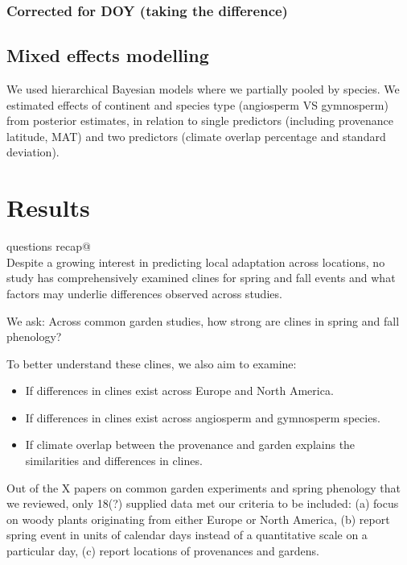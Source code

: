 \documentclass{article}
\begin{document}
\subsubsection{Corrected for DOY (taking the difference)}
\subsection{Mixed effects modelling}

We used hierarchical Bayesian models where we partially pooled by species. We estimated effects of continent and species type (angiosperm VS gymnosperm) from posterior estimates, in relation to single predictors (including provenance latitude, MAT) and two predictors (climate overlap percentage and standard deviation). 


\section{Results}

\verb@Research questions recap@
\\
Despite a growing interest in predicting local adaptation across locations, no study has comprehensively examined clines for spring and fall events and what factors may underlie differences observed across studies.

We ask: Across common garden studies, how strong are clines in spring and fall phenology?

To better understand these clines, we also aim to examine:
\begin{itemize}
\item If differences in clines exist across Europe and North America.
\item If differences in clines exist across angiosperm and gymnosperm species.
\item If climate overlap between the provenance and garden explains the similarities and differences in clines.
\end{itemize}

Out of the X papers on common garden experiments and spring phenology that we reviewed, only 18(?) supplied data met our criteria to be included: (a) focus on woody plants originating from either Europe or North America, (b) report spring event in units of calendar days instead of a quantitative scale on a particular day, (c) report locations of provenances and gardens. 
\end{document}
